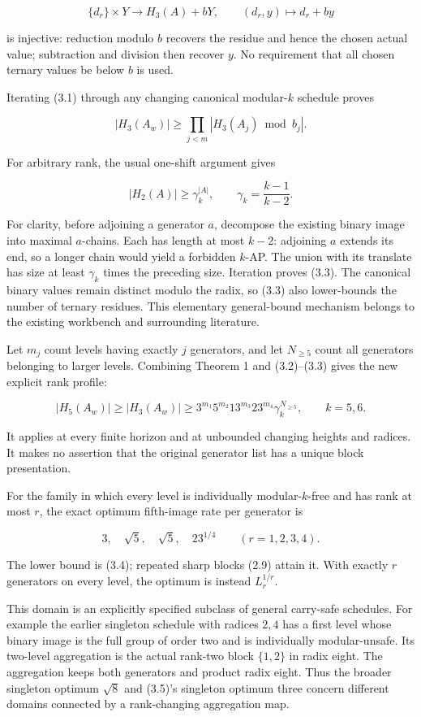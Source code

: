 \[
\{d_r\}\times Y\longrightarrow H_3(A)+bY,
\qquad(d_r,y)\longmapsto d_r+by
\tag{3.1}
\]

is injective: reduction modulo \(b\) recovers the residue and hence the chosen actual value; subtraction and division then recover \(y\). No requirement that all chosen ternary values be below \(b\) is used.

Iterating (3.1) through any changing canonical modular-\(k\) schedule proves

\[
|H_3(A_w)|\ge\prod_{j<m}|H_3(A_j)\bmod b_j|.
\tag{3.2}
\]

For arbitrary rank, the usual one-shift argument gives

\[
|H_2(A)|\ge\gamma_k^{|A|},\qquad
\gamma_k=\frac{k-1}{k-2}.
\tag{3.3}
\]

For clarity, before adjoining a generator \(a\), decompose the existing binary image into maximal \(a\)-chains. Each has length at most \(k-2\): adjoining \(a\) extends its end, so a longer chain would yield a forbidden \(k\)-AP. The union with its translate has size at least \(\gamma_k\) times the preceding size. Iteration proves (3.3). The canonical binary values remain distinct modulo the radix, so (3.3) also lower-bounds the number of ternary residues. This elementary general-bound mechanism belongs to the existing workbench and surrounding literature.

Let \(m_j\) count levels having exactly \(j\) generators, and let \(N_{\ge5}\) count all generators belonging to larger levels. Combining Theorem 1 and (3.2)--(3.3) gives the new explicit rank profile:

\[
\boxed{
|H_5(A_w)|\ge|H_3(A_w)|
\ge3^{m_1}5^{m_2}13^{m_3}23^{m_4}
\gamma_k^{N_{\ge5}},\qquad k=5,6.
}
\tag{3.4}
\]

It applies at every finite horizon and at unbounded changing heights and radices. It makes no assertion that the original generator list has a unique block presentation.

For the family in which every level is individually modular-\(k\)-free and has rank at most \(r\), the exact optimum fifth-image rate per generator is

\[
\boxed{3,\quad\sqrt5,\quad\sqrt5,\quad23^{1/4}
\qquad(r=1,2,3,4).}
\tag{3.5}
\]

The lower bound is (3.4); repeated sharp blocks (2.9) attain it. With exactly \(r\) generators on every level, the optimum is instead \(L_r^{1/r}\).

This domain is an explicitly specified subclass of general carry-safe schedules. For example the earlier singleton schedule with radices \(2,4\) has a first level whose binary image is the full group of order two and is individually modular-unsafe. Its two-level aggregation is the actual rank-two block \(\{1,2\}\) in radix eight. The aggregation keeps both generators and product radix eight. Thus the broader singleton optimum \(\sqrt8\) and (3.5)'s singleton optimum three concern different domains connected by a rank-changing aggregation map.

